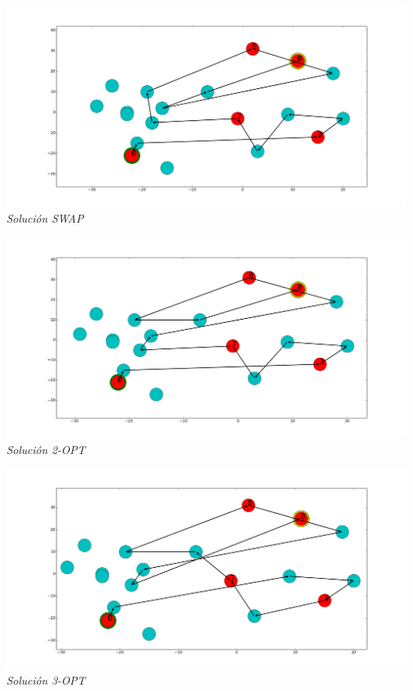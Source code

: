 \vspace*{0.3cm} \vspace*{0.3cm}
  \begin{center}
 \includegraphics[scale=0.3]{./EJ3/randomswap.png}\\
 {            \textit{Soluci\'on SWAP}}
  \end{center}
  \vspace*{0.3cm}

\vspace*{0.3cm} \vspace*{0.3cm}
  \begin{center}
 \includegraphics[scale=0.3]{./EJ3/random2opt.png}\\
 {            \textit{Soluci\'on 2-OPT}}
  \end{center}
  \vspace*{0.3cm}


\vspace*{0.3cm} \vspace*{0.3cm}
  \begin{center}
 \includegraphics[scale=0.3]{./EJ3/random3opt.png}\\
 {            \textit{Soluci\'on 3-OPT}}
  \end{center}
  \vspace*{0.3cm}
  

